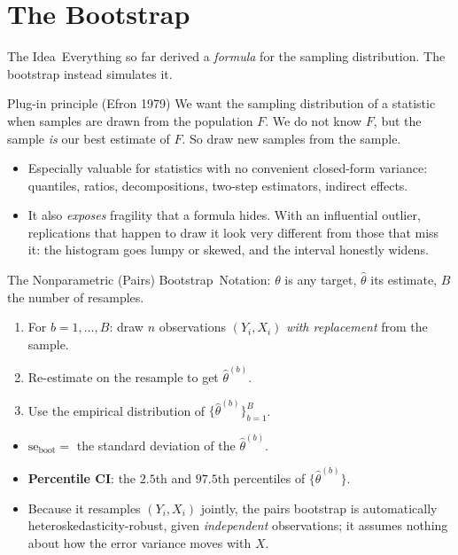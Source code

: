\documentclass[aspectratio=169,11pt,xcolor=dvipsnames]{beamer}
\newcommand{\srcp}[1]{{\scriptsize\color{gray}(#1)}}   %
\newcommand{\SE}{\mathrm{se}}
\newcommand{\core}{\,\raisebox{0.6pt}{\textcolor{corestar}{$\bigstar$}}}
\begin{document}
\section[Bootstrap]{The Bootstrap}
\begin{frame}\sectionpage\end{frame}

\begin{frame}{The Idea\core}
Everything so far derived a \emph{formula} for the sampling distribution. The
bootstrap instead \alert{simulates} it.
\vskip4pt
\begin{block}{Plug-in principle \srcp{Efron 1979}}
We want the sampling distribution of a statistic when samples are drawn from the
population $F$. We do not know $F$, but the sample \emph{is} our best estimate
of $F$. So draw new samples from the sample.
\end{block}
\vskip4pt
\begin{itemize}\itemsep3pt
  \item Especially valuable for statistics with no convenient closed-form
        variance: quantiles, ratios, decompositions, two-step estimators,
        indirect effects.
  \item It also \emph{exposes} fragility that a formula hides. With an
        influential outlier, replications that happen to draw it look very
        different from those that miss it: the histogram goes lumpy or
        skewed, and the interval honestly widens.
\end{itemize}
\end{frame}

\begin{frame}{The Nonparametric (Pairs) Bootstrap\core}
Notation: $\theta$ is any target, $\hat\theta$ its estimate, $B$ the number
of resamples.
\begin{enumerate}\itemsep2pt
  \item For $b=1,\dots,B$: draw $n$ observations $(Y_i, X_i)$ \emph{with
        replacement} from the sample.
  \item Re-estimate on the resample to get $\hat\theta^{(b)}$.
  \item Use the empirical distribution of $\{\hat\theta^{(b)}\}_{b=1}^B$.
\end{enumerate}
\vskip4pt
\begin{itemize}\itemsep3pt
  \item $\SE_{\text{boot}} = $ the standard deviation of the $\hat\theta^{(b)}$.
  \item \textbf{Percentile CI}: the $2.5$th and $97.5$th percentiles of
        $\{\hat\theta^{(b)}\}$.
  \item Because it resamples $(Y_i,X_i)$ jointly, the pairs bootstrap is
        automatically heteroskedasticity-robust, given \emph{independent}
        observations; it assumes nothing about how the error variance moves
        with $X$.
\end{itemize}
\end{frame}
\end{document}
